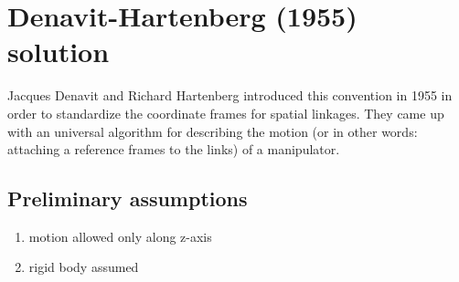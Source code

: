 \documentclass[12pt, a4paper]{extarticle}
\begin{document}
	\def\thetaone{30}
	\def\Lone{2}
	\def\thetatwo{30}
	\def\Ltwo{2}
	\def\thetathree{30}
	\def\Lthree{1}

	\begin{center}
	\end{center}


	\section{Denavit-Hartenberg (1955) solution}

	Jacques Denavit and Richard Hartenberg introduced this convention in 1955 in order to standardize the coordinate frames for spatial linkages. They came up with an universal algorithm for describing the motion (or in other words: attaching a reference frames to the links) of a manipulator.

	\subsection{Preliminary assumptions}
	\begin{enumerate}
		\setlength\itemsep{-0.3em}
		\item motion allowed only along z-axis
		\item rigid body assumed
	\end{enumerate}
	\noindent
\end{document}
